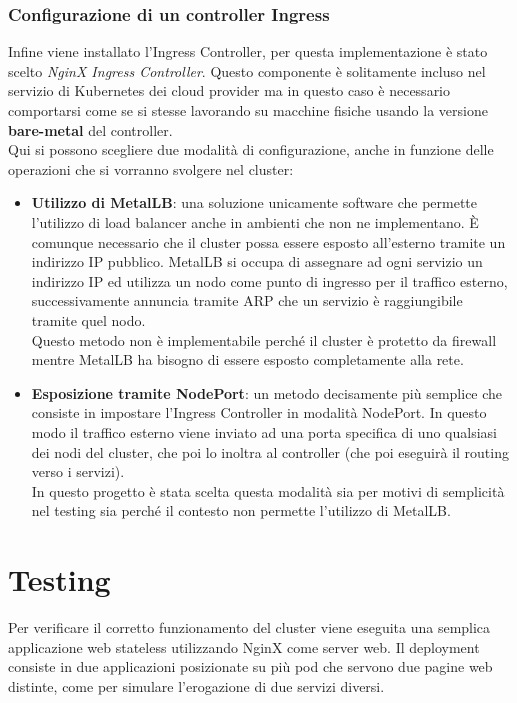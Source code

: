 \documentclass[12pt,a4paper,openright,twoside]{book}
\begin{document}
\subsection{Configurazione di un controller Ingress}
\label{sec:ingress}
Infine viene installato l'Ingress Controller, per questa implementazione è stato scelto \textit{NginX Ingress Controller}. Questo componente è solitamente
incluso nel servizio di Kubernetes dei cloud provider ma in questo caso è necessario comportarsi come se si stesse lavorando su macchine fisiche usando la 
versione \textbf{bare-metal} del controller.\\
Qui si possono scegliere due modalità di configurazione, anche in funzione delle operazioni che si vorranno svolgere nel cluster\cite{nginx-ingress-controller}:
\begin{itemize}
    \item \textbf{Utilizzo di MetalLB}: una soluzione unicamente software che permette l'utilizzo di load balancer anche in ambienti che non ne implementano.
        È comunque necessario che il cluster possa essere esposto all'esterno tramite un indirizzo IP pubblico. MetalLB si occupa di assegnare ad ogni servizio un
        indirizzo IP ed utilizza un nodo come punto di ingresso per il traffico esterno, successivamente annuncia tramite ARP che un servizio è raggiungibile tramite 
        quel nodo.\\
        Questo metodo non è implementabile perché il cluster è protetto da firewall mentre MetalLB ha bisogno di essere esposto completamente alla rete.
    \item \textbf{Esposizione tramite NodePort}: un metodo decisamente più semplice che consiste in impostare l'Ingress Controller in modalità NodePort.
        In questo modo il traffico esterno viene inviato ad una porta specifica di uno qualsiasi dei nodi del cluster, che poi lo inoltra al controller (che poi
        eseguirà il routing verso i servizi).\\
        In questo progetto è stata scelta questa modalità sia per motivi di semplicità nel testing sia perché il contesto non permette l'utilizzo di MetalLB.
\end{itemize} 
\chapter{Testing}
Per verificare il corretto funzionamento del cluster viene eseguita una semplica applicazione web stateless utilizzando NginX come server web. Il deployment consiste in due applicazioni
posizionate su più pod che servono due pagine web distinte, come per simulare l'erogazione di due servizi diversi.
\end{document}
